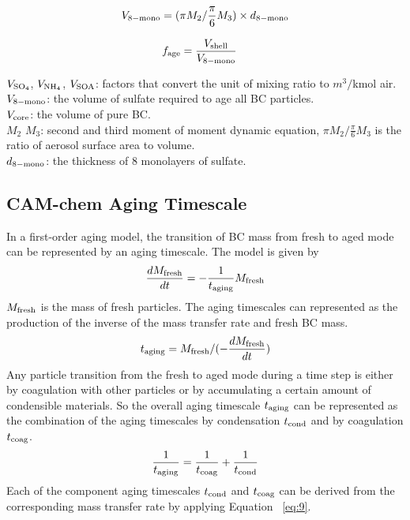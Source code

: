 \documentclass[12pt]{article}
\begin{document}
		 \begin{align}
		 \begin{split}
		 V_{\rm{8-mono}} = (\pi M_2/ \frac{\pi}{6}M_3) \times d_{\rm{8-mono}}
		 \end{split}
		 \end{align}
		 
		 \begin{align}
		 f_{\rm{age}} &= \frac{V_{\rm{shell}}}{V_{\rm{8-mono}}}  
		 \end{align}
		 
		 \begin{flushleft}
		 	$V_{\rm{SO_4}}$, $V_{\rm{NH_4}}$, $V_{\rm{SOA}}$: factors that convert the unit of mixing ratio to $m^3/$kmol air. \\
		 	$V_{\rm{8-mono}}$: the volume of sulfate required to age all BC particles. \\
		 	$V_{\rm{core}}$: the volume of pure BC. \\
		 	$M_2$ $M_3$: second and third moment of  moment dynamic equation, $\pi M_2/ \frac{\pi}{6}M_3$ is the ratio of aerosol surface area to volume. \\
		 	$d_{\rm{8-mono}}$: the thickness of 8 monolayers of sulfate.
		 \end{flushleft}
		 
		 \subsection{CAM-chem Aging Timescale}
		 In a first-order aging model, the transition of BC mass from fresh to aged mode can be represented by an aging timescale. The model is given by
		 \begin{align}
		 \frac{dM_{\rm{fresh}}}{dt} = -\frac{1}{t_{\rm{aging}}}M_{\rm{fresh}} 
		 \end{align}
		 $M_{\rm{fresh}}$ is the mass of fresh particles.
		 The aging timescales can represented as the production of the inverse of the mass transfer rate and fresh BC mass. 
		 \begin{align}\label{eq:9}
		 t_{\rm{aging}} = M_{\rm{fresh}}/(-\frac{dM_{\rm{fresh}}}{dt})
		 \end{align}
		 Any particle transition from the fresh to aged mode during a time step is either by coagulation with other particles or by accumulating a certain amount of condensible materials. So the overall aging timescale $t_{\rm{aging}}$ can be represented as the combination of the aging timescales by condensation $t_{\rm{cond}}$ and by coagulation $t_{\rm{coag}}$.
		 \begin{align}\label{eq:10}
		 \frac{1}{t_{\rm{aging}}} =\frac{1}{t_{\rm{coag}}} + \frac{1}{t_{\rm{cond}}}
		 \end{align}
		 Each of the component aging timescales $t_{\rm{cond}}$ and $t_{\rm{coag}}$ can be derived from the corresponding mass transfer rate by applying Equation~ \ref{eq:9}. 
		 
\end{document}

